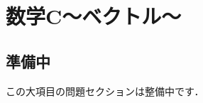 \documentclass[../../uem_mat_std_q.tex]{subfiles}
\begin{document}
\section{数学C～ベクトル～}

\subsection*{準備中}
この大項目の問題セクションは整備中です．
\end{document}
